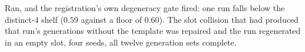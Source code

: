 Ran, and the registration's own degeneracy gate fired: one run falls below the \mbox{distinct-4} shelf ($0.59$ against a floor of $0.60$). The slot collision that had produced that run's generations without the template was repaired and the run regenerated in an empty slot, four seeds, all twelve generation sets complete.